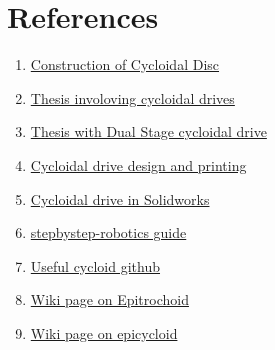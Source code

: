 \documentclass{article}
\begin{document}
\section{References}

\begin{enumerate}
    \item  \href{https://www.tec-science.com/mechanical-power-transmission/planetary-gear/construction-of-the-cycloidal-disc/}{Construction of Cycloidal Disc}
    \item  \href{https://digitalcommons.njit.edu/cgi/viewcontent.cgi?article=2822&context=theses}{Thesis involoving cycloidal drives}
    \item \href{https://www.researchgate.net/publication/235992854_A_New_Design_of_a_Two-Stage_Cycloidal_Speed_Reducer}{Thesis with Dual Stage cycloidal drive}
    \item  \href{https://howtomechatronics.com/how-it-works/what-is-cycloidal-driver-designing-3d-printing-and-testing/}{Cycloidal drive design and printing}
    \item  \href{https://blogs.solidworks.com/teacher/wp-content/uploads/sites/3/Building-a-Cycloidal-Drive-with-SOLIDWORKS.pdf}{Cycloidal drive in Solidworks}
    \item  \href{https://stepbystep-robotics.com/hp/robots/cycloidal-drive/}{stepbystep-robotics guide}
    \item  \href{https://github.com/roTechnic/CycloidalDesign/blob/main/pyplot\%20cycloid.py}{Useful cycloid github}
    \item  \href{https://en.wikipedia.org/wiki/Epitrochoid}{Wiki page on Epitrochoid}
    \item  \href{https://en.wikipedia.org/wiki/Epicycloid}{Wiki page on epicycloid}
\end{enumerate}
\end{document}
